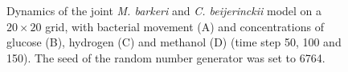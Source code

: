 \begin{figure}[h!]
{\begin{minipage}[t]{0.3\textwidth}
  \end{minipage}
  }
  \caption{Dynamics of the joint \emph{M. barkeri} and \emph{C. beijerinckii} model on a $20\times20$ grid, with bacterial movement (A) and concentrations of glucose (B), hydrogen (C) and methanol (D) (time step 50, 100 and 150). The seed of the random number generator was set to 6764.}
  \label{fig:cbgrid}
\end{figure}

